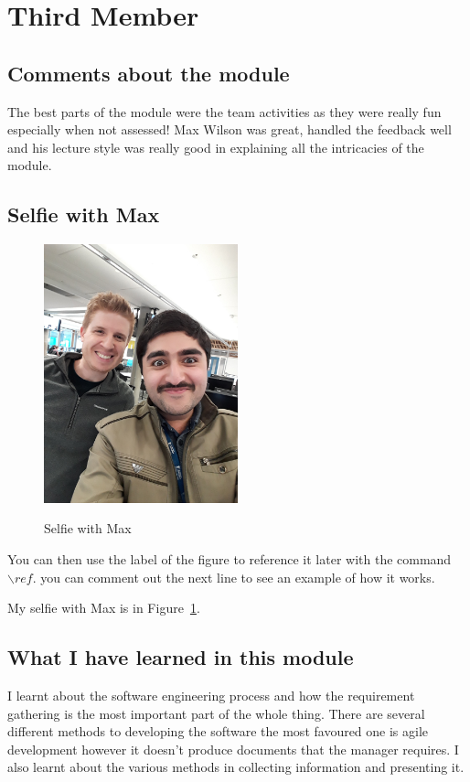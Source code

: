 \section{Third Member}

\subsection{Comments about the module}
The best parts of the module were the team activities as they were really fun especially when not assessed! Max Wilson was great, handled the feedback well and his lecture style was really good in explaining all the intricacies of the module.

\subsection{Selfie with Max}

\begin{figure}[h!]
\caption{Selfie with Max}
\centering
\includegraphics[width=0.5\textwidth]{Selfie_with_max.jpg}
\label{fig:selfie}
\end{figure}

You can then use the label of the figure to reference it later with the command ${\backslash}ref$. you can comment out the next line to see an example of how it works.

My selfie with Max is in  Figure~\ref{fig:selfie}.

\subsection{What I have learned in this module}
I learnt about the software engineering process and how the requirement gathering is the most important part of the whole thing. There are several different methods to developing the software the most favoured one is agile development however it doesn't produce documents that the manager requires. I also learnt about the various methods in collecting information and presenting it.

